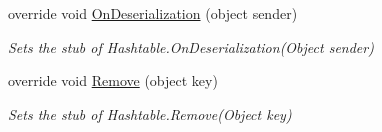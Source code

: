 \begin{DoxyCompactItemize}
override void \hyperlink{class_system_1_1_configuration_1_1_fakes_1_1_stub_settings_attribute_dictionary_a385c7abbf0bbb4b90fb5c324f725acc1}{On\-Deserialization} (object sender)
\begin{DoxyCompactList}\small\item\em Sets the stub of Hashtable.\-On\-Deserialization(\-Object sender)\end{DoxyCompactList}\item 
override void \hyperlink{class_system_1_1_configuration_1_1_fakes_1_1_stub_settings_attribute_dictionary_a5bdc71a643c3fc0b591016237563f0eb}{Remove} (object key)
\begin{DoxyCompactList}\small\item\em Sets the stub of Hashtable.\-Remove(\-Object key)\end{DoxyCompactList}\end{DoxyCompactItemize}
